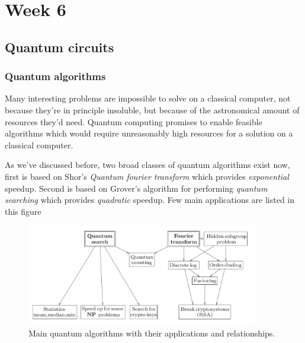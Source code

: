 \part{Week 6}
\chapter{Quantum circuits}
\section{Quantum algorithms}
Many interesting problems are impossible to solve on a classical computer, not because they're in principle insoluble, but because of the astronomical amount of resources they'd need. Quantum computing promises to enable feasible algorithms which would require unreasonably high resources for a solution on a classical computer.

As we've discussed before, two broad classes of quantum algorithms exist now, first is based on Shor's \textit{Quantum fourier transform} which provides \textit{exponential} speedup. Second is based on Grover's algorithm for performing \textit{quantum searching} which provides \textit{quadratic} speedup. Few main applications are listed in this figure
\begin{figure}[H]
    \centering
    \includegraphics[width=0.9\textwidth]{images/quantum_algorithms.png}
    \caption{Main quantum algorithms with their applications and relationships.}
    \label{fig:quantum-algorithms}
\end{figure}

